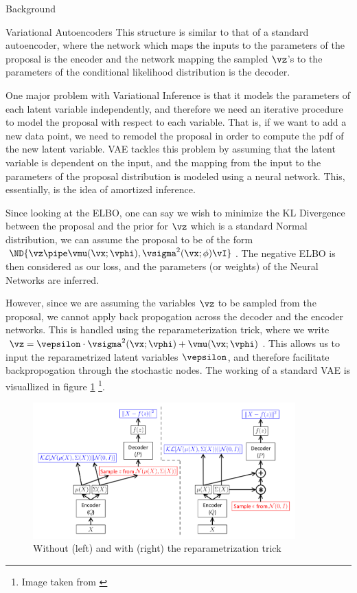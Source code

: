 \documentclass{article}
\begin{document}
\begin{psection}{Background}
\begin{psubsection}{Variational Autoencoders}
		This structure is similar to that of a standard autoencoder, where the network which maps the inputs to the parameters of the proposal is the encoder and the network mapping the sampled $\vz$'s to the parameters of the conditional likelihood distribution is the decoder.

		One major problem with Variational Inference is that it models the parameters of each latent variable independently, and therefore we need an iterative procedure to model the proposal with respect to each variable. That is, if we want to add a new data point, we need to remodel the proposal in order to compute the pdf of the new latent variable. VAE tackles this problem by assuming that the latent variable is dependent on the input, and the mapping from the input to the parameters of the proposal distribution is modeled using a neural network. This, essentially, is the idea of amortized inference.

		Since looking at the ELBO, one can say we wish to minimize the KL Divergence between the proposal and the prior for $\vz$ which is a standard Normal distribution, we can assume the proposal to be of the form \ $\ND{\vz \pipe \vmu(\vx; \vphi), {\vsigma}^2(\vx; \phi) \vI}$. The negative ELBO is then considered as our loss, and the parameters (or weights) of the Neural Networks are inferred.

		However, since we are assuming the variables $\vz$ to be sampled from the proposal, we cannot apply back propogation across the decoder and the encoder networks. This is handled using the reparameterization trick, where we write $\vz = \vepsilon \cdot {\vsigma}^2(\vx; \vphi) + \vmu(\vx; \vphi)$. This allows us to input the reparametrized latent variables $\vepsilon$, and therefore facilitate backpropogation through the stochastic nodes. The working of a standard VAE is visuallized in figure \ref{fig:VAE} \footnote{Image taken from \cite{vae-tut}}.

		\begin{figure}
			\centering
			\includegraphics[width=0.9\textwidth]{includes/vae.png}
			\caption{Without (left) and with (right) the reparametrization trick}
			\label{fig:VAE}
		\end{figure}

	\end{psubsection}

\end{psection}
\end{document}

